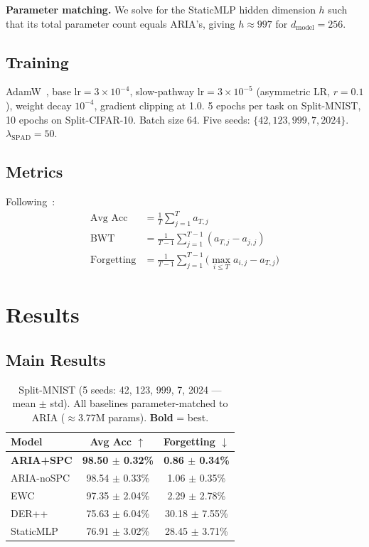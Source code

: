 \documentclass[10pt,twocolumn]{article}
\begin{document}
\textbf{Parameter matching.} We solve for the StaticMLP hidden dimension $h$ such
that its total parameter count equals ARIA's, giving $h \approx 997$ for
$d_{\mathrm{model}}=256$.

\subsection{Training}

AdamW~\citep{loshchilov2019decoupled}, base $\mathrm{lr}=3 \times 10^{-4}$,
slow-pathway $\mathrm{lr}=3 \times 10^{-5}$ (asymmetric LR, $r=0.1$),
weight decay $10^{-4}$, gradient clipping at 1.0. 5 epochs per task on Split-MNIST,
10 epochs on Split-CIFAR-10.
Batch size 64. Five seeds: $\{42, 123, 999, 7, 2024\}$.
$\lambda_{\mathrm{SPAD}} = 50$.

\subsection{Metrics}

Following~\citep{lopez2017gradient}:
\begin{align}
  \text{Avg Acc} &= \frac{1}{T} \sum_{j=1}^{T} a_{T,j} \\
  \text{BWT} &= \frac{1}{T-1} \sum_{j=1}^{T-1} (a_{T,j} - a_{j,j}) \\
  \text{Forgetting} &= \frac{1}{T-1} \sum_{j=1}^{T-1} \bigl(\max_{i \leq T} a_{i,j} - a_{T,j}\bigr)
\end{align}

\section{Results}
\label{sec:results}

\subsection{Main Results}

\begin{table}[h]
\centering
\caption{Split-MNIST (5 seeds: 42, 123, 999, 7, 2024 --- mean $\pm$ std).
All baselines parameter-matched to ARIA ($\approx$3.77M params). \textbf{Bold} = best.}
\label{tab:main}
\begin{tabular}{lcc}
\toprule
Model       & Avg Acc $\uparrow$            & Forgetting $\downarrow$      \\
\midrule
\textbf{ARIA+SPC}  & \textbf{98.50 $\pm$ 0.32\%} & \textbf{0.86 $\pm$ 0.34\%}  \\
ARIA-noSPC         & 98.54 $\pm$ 0.33\%          & 1.06 $\pm$ 0.35\%           \\
EWC                & 97.35 $\pm$ 2.04\%          & 2.29 $\pm$ 2.78\%           \\
DER++              & 75.63 $\pm$ 6.04\%          & 30.18 $\pm$ 7.55\%          \\
StaticMLP          & 76.91 $\pm$ 3.02\%          & 28.45 $\pm$ 3.71\%          \\
\bottomrule
\end{tabular}
\end{table}
\end{document}
